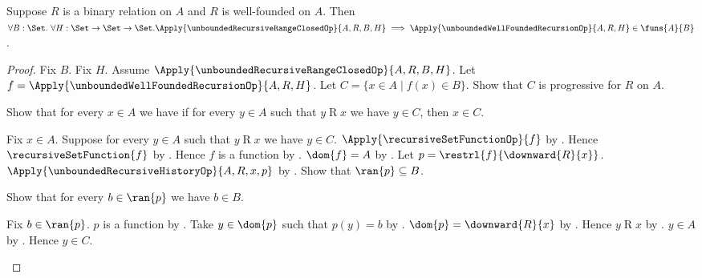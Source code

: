 \begin{theorem}\label{unbounded_well_founded_recursion_range}
    Suppose $R$ is a binary relation on $A$ and $R$ is well-founded on $A$.
    Then $\forall B:\Set.\ \forall H:\Set\to\Set\to\Set.
        \Apply{\unboundedRecursiveRangeClosedOp}
            {A,R,B,H}
        \implies
        \Apply{\unboundedWellFoundedRecursionOp}
            {A,R,H}\in\funs{A}{B}$.
\end{theorem}
\begin{proof}
    Fix $B$.
    Fix $H$.
    Assume $\Apply{\unboundedRecursiveRangeClosedOp}
        {A,R,B,H}$.
    Let $f=\Apply{\unboundedWellFoundedRecursionOp}
        {A,R,H}$.
    Let $C=\{x\in A\mid f(x)\in B\}$.
    Show that $C$ is progressive for $R$ on $A$.
    \begin{subproof}
        Show that for every $x\in A$ we have
            if for every $y\in A$ such that $y\mathrel{R}x$ we have
                $y\in C$,
            then $x\in C$.
        \begin{subproof}
            Fix $x\in A$.
            Suppose for every $y\in A$ such that $y\mathrel{R}x$ we have
                $y\in C$.
            $\Apply{\recursiveSetFunctionOp}{f}$ by
                .
            Hence $\recursiveSetFunction{f}$ by
                .
            Hence $f$ is a function by .
            $\dom{f}=A$ by
                .
            Let $p=\restrl{f}{\downward{R}{x}}$.
            $\Apply{\unboundedRecursiveHistoryOp}
                {A,R,x,p}$ by
                .
            Show that $\ran{p}\subseteq B$.
            \begin{subproof}
                Show that for every $b\in\ran{p}$ we have $b\in B$.
                \begin{subproof}
                    Fix $b\in\ran{p}$.
                    $p$ is a function by
                        .
                    Take $y\in\dom{p}$ such that $p(y)=b$ by
                        .
                    $\dom{p}=\downward{R}{x}$ by
                        .
                    Hence $y\mathrel{R}x$ by
                        .
                    $y\in A$ by
                        .
                    Hence $y\in C$.

\end{subproof}
\end{subproof}
\end{subproof}
\end{subproof}
\end{proof}
